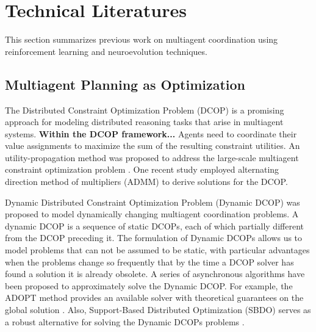 \documentclass[conference]{IEEEtran}
\begin{document}
\section{Technical Literatures} \label{section:literature}
This section summarizes previous work on multiagent
coordination using reinforcement learning and
neuroevolution techniques.

\subsection{Multiagent Planning as Optimization}
The Distributed Constraint Optimization Problem (DCOP) is a promising approach
for modeling distributed reasoning tasks that arise in multiagent systems.
\textbf{Within the DCOP framework...}
Agents need to coordinate their value assignments
to maximize the sum of the resulting constraint utilities.  
An utility-propagation method was proposed to address the large-scale multiagent
constraint optimization problem \cite{petcu2005scalable}.
One recent study \cite{boyd2011distributed} employed alternating direction
method of multipliers (ADMM) to derive solutions for the DCOP.

Dynamic Distributed Constraint Optimization Problem (Dynamic DCOP) was
proposed to model dynamically changing multiagent coordination problems.
A dynamic DCOP is a sequence of static DCOPs, each of which partially
different from the DCOP preceding it.
The formulation of Dynamic DCOPs allows us to model problems that
can not be assumed to be static, with particular advantages when the problems
change so frequently that by the time a DCOP solver has found a solution
it is already obsolete. 
A series of asynchronous algorithms have been proposed to approximately solve
the Dynamic DCOP. 
For example, the ADOPT method provides an available solver with theoretical
guarantees on the global solution \cite{modi2005adopt}. 
Also, Support-Based Distributed Optimization (SBDO) serves as a robust
alternative for solving the Dynamic DCOPs problems \cite{billiau2012sbdo}.
\end{document}
